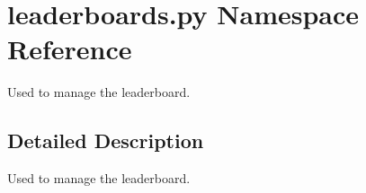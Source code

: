 \hypertarget{namespaceleaderboards_1_1py}{}\section{leaderboards.\+py Namespace Reference}
\label{namespaceleaderboards_1_1py}


Used to manage the leaderboard.  




\subsection{Detailed Description}
Used to manage the leaderboard. 